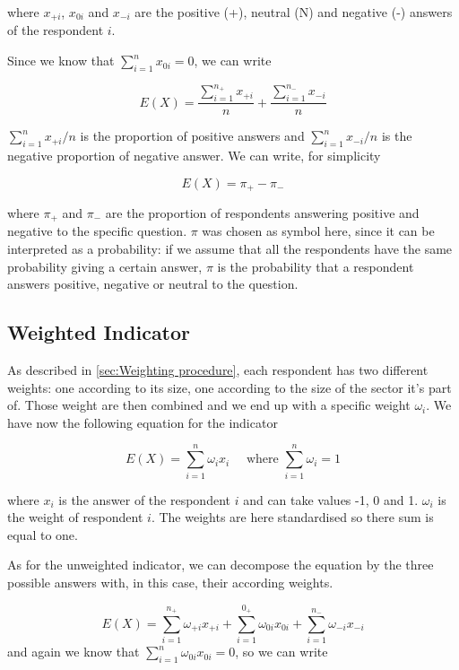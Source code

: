 \documentclass[12pt,a4paper,oneside]{book}
\begin{document}
where 
$x_{+i}$, $x_{0i}$ and $x_{-i}$ are the positive (+), neutral (N) and negative (-) answers of the respondent $i$.

Since we know that $\sum_{i=1}^n x_{0i} = 0$, we can write

\begin{equation}
    E(X) = \frac{\sum_{i=1}^{n_+} x_{+i}}{n}  + \frac{\sum_{i=1}^{n_-} x_{-i}}{n}
\end{equation} 

${\sum_{i=1}^n x_{+i}}/{n}$ is the proportion of positive answers and ${\sum_{i=1}^n x_{-i}}/{n}$ is the negative proportion of negative answer. We can write, for simplicity

\begin{equation}
    E(X) = \pi_+ - \pi_-  \label{eq: BSI Unweighted}
\end{equation}

where $\pi_+$ and $\pi_-$ are the proportion of respondents answering positive and negative to the specific question.
$\pi$ was chosen as symbol here,  since it can be interpreted as a probability: if we assume that all the respondents have the same probability giving a certain answer, $\pi$ is the probability that a respondent answers positive, negative or neutral to the question. 


\subsection{Weighted Indicator}

As described in \autoref{sec:Weighting procedure}, each respondent has two different weights: one according to its size, one according to the size of the sector it's part of. Those weight are then combined and we end up with a specific weight $\omega_i$.
We have now the following equation for the indicator

\begin{equation}
    E(X) = \sum_{i=1}^n \omega_i x_i  \quad \text{  where  } \sum_{i=1}^n \omega_i =  1
\end{equation} 

where
$x_i$ is the answer of the respondent $i$ and can take values -1, 0 and 1.
$\omega_i$ is the weight of respondent $i$. 
The weights are here standardised so there sum is equal to one.

As for the unweighted indicator, we can decompose the equation by the three possible answers with, in this case, their according weights.

\begin{equation}
    E(X) = \sum_{i=1}^{n_+} \omega_{+i} x_{+i} + \sum_{i=1}^{0_+} \omega_{0i} x_{0i} + \sum_{i=1}^{n_-} \omega_{-i} x_{-i}
 \end{equation}
and again we know that $\sum_{i=1}^n \omega_{0i} x_{0i} = 0$, so we can write
\end{document}
